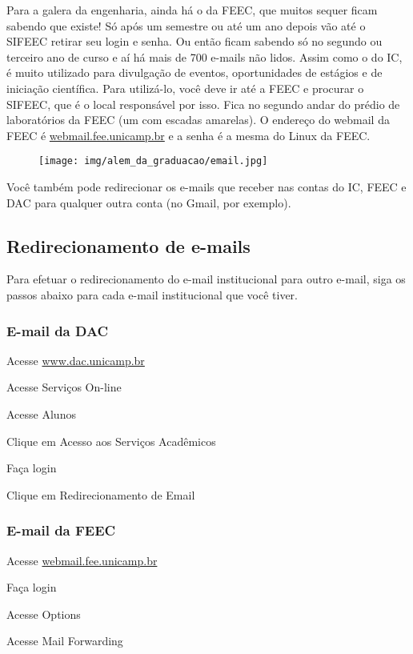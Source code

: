 Para a galera da engenharia, ainda há o da FEEC, que muitos sequer ficam
sabendo que existe! Só após um semestre ou até um ano depois vão até o SIFEEC
retirar seu login e senha. Ou então ficam sabendo só no segundo ou terceiro ano
de curso e aí há mais de 700 e-mails não lidos. Assim como o do IC, é muito
utilizado para divulgação de eventos, oportunidades de estágios e de iniciação
científica. Para utilizá-lo, você deve ir até a FEEC e procurar o SIFEEC, que é
o local responsável por isso. Fica no segundo andar do prédio de laboratórios
da FEEC (um com escadas amarelas). O endereço do webmail da FEEC é
\url{webmail.fee.unicamp.br} e a senha é a mesma do Linux da FEEC.

\begin{figure}[b!]
  \centering
  \texttt{[image: img/alem\_da\_graduacao/email.jpg]}
\end{figure}

Você também pode redirecionar os e-mails que receber nas contas do IC, FEEC e
DAC para qualquer outra conta (no Gmail, por exemplo).

\subsection{Redirecionamento de e-mails}
Para efetuar o redirecionamento do e-mail institucional para outro e-mail, siga
os passos abaixo para cada e-mail institucional que você tiver.

\subsubsection{E-mail da DAC}

\begin{compactenumerate}
\item Acesse \url{www.dac.unicamp.br}
\item Acesse Serviços On-line
\item Acesse Alunos
\item Clique em Acesso aos Serviços Acadêmicos
\item Faça login
\item Clique em Redirecionamento de Email
\end{compactenumerate}

\subsubsection{E-mail da FEEC}

\begin{compactenumerate}
\item Acesse \url{webmail.fee.unicamp.br}
\item Faça login
\item Acesse Options
\item Acesse Mail Forwarding
\end{compactenumerate}

